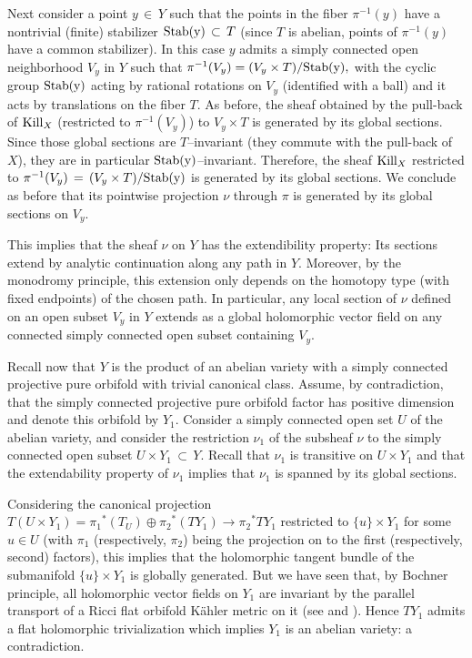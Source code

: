 \documentclass[12pt,reqno]{amsart}
\theoremstyle{definition}
\numberwithin{equation}{section}
\begin{document}
Next consider a point $y\,\in\, Y$ such that the points in the fiber $\pi^{-1} (y)$ have a nontrivial 
(finite) stabilizer ${\rm Stab(y)}\, \subset\, T$ (since $T$ is abelian, points of $\pi^{-1} (y)$ have a 
common stabilizer). In this case $y$ admits a simply connected open neighborhood $V_y$ in $Y$ such that 
$\pi^{-1}(V_y)= (V_y \times T)/{\rm Stab(y)},$ with the cyclic group ${\rm Stab(y)}$ acting by rational 
rotations on $V_y$ (identified with a ball) and it acts by translations on the fiber $T$. As before, the 
sheaf obtained by the pull-back of ${\rm Kill}_X$ (restricted to $\pi^{-1}(V_y)$) to $V_y \times T$ is 
generated by its global sections. Since those global sections are $T$--invariant (they commute with the 
pull-back of $X$), they are in particular ${\rm Stab(y)}$--invariant. Therefore, the sheaf ${\rm Kill}_X$ 
restricted to $\pi^{-1}(V_y)\,=\, (V_y \times T)/{\rm Stab(y)}$ is generated by its global sections. We 
conclude as before that its pointwise projection $\nu$ through $\pi$ is generated by its global sections on 
$V_y$.

This implies that the sheaf $\nu$ on $Y$ has the extendibility property: Its sections extend by analytic 
continuation along any path in $Y$. Moreover, by the monodromy principle, this extension only depends on 
the homotopy type (with fixed endpoints) of the chosen path. In particular, any local section of $\nu$ 
defined on an open subset $V_y$ in $Y$ extends as a global holomorphic vector field on any connected simply 
connected open subset containing $V_y$.

Recall now that $Y$ is the product of an abelian variety with a simply connected projective pure orbifold 
with trivial canonical class. Assume, by contradiction, that the simply connected projective pure orbifold 
factor has positive dimension and denote this orbifold by $Y_1$. Consider a simply connected open set $U$ of the 
abelian variety, and consider the restriction $\nu_1$ of the subsheaf $\nu$ to the simply connected open subset 
$U \times Y_1 \,\subset\, Y$. Recall that $\nu_1$ is transitive on $U \times Y_1$ and that the extendability 
property of $\nu_1$ implies that $\nu_1$ is spanned by its global sections.

Considering the canonical projection $T(U \times Y_1)={\pi_1}^{*}(T_U) \oplus {\pi_2}^{*}(TY_1) 
\longrightarrow {\pi_2}^{*} TY_1$ restricted to $\{u \} \times Y_1$ for some $u \in U$ (with $\pi_1$ 
(respectively, $\pi_2$) being the projection on to the first (respectively, second) factors), this implies 
that the holomorphic tangent bundle of the submanifold $\{u \} \times Y_1$ is globally generated. But we 
have seen that, by Bochner principle, all holomorphic vector fields on $Y_1$ are invariant by the parallel 
transport of a Ricci flat orbifold K\"ahler metric on it (see \cite[Theorem 8.2]{GGK} and \cite[Theorem 
A]{CGGN}). Hence $TY_1$ admits a flat holomorphic trivialization which implies $Y_1$ is an abelian variety: 
a contradiction.
\end{document}
